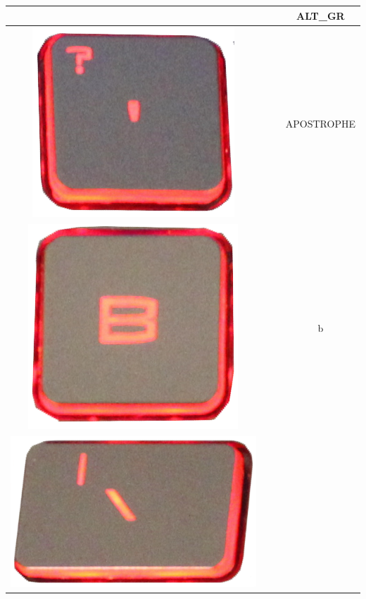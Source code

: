 \begin{longtable}{cccc}
\begin{minipage}[c]{.3\textwidth}
\vspace{0.2cm}
\end{minipage} & & & ALT\_GR\\
\hline
\begin{minipage}[c]{.3\textwidth}
\vspace{0.2cm}
\includegraphics[scale=0.1]{Images/KeyMapping/APOSTROPHE}
\vspace{0.2cm}
\end{minipage} & & & APOSTROPHE\\
\hline
\begin{minipage}[c]{.3\textwidth}
\vspace{0.2cm}
\includegraphics[scale=0.1]{Images/KeyMapping/b}
\vspace{0.2cm}
\end{minipage} & & & b\\
\hline
\begin{minipage}[c]{.3\textwidth}
\vspace{0.2cm}
\includegraphics[scale=0.1]{Images/KeyMapping/BACKSLASH}

\end{minipage}
\end{longtable}
